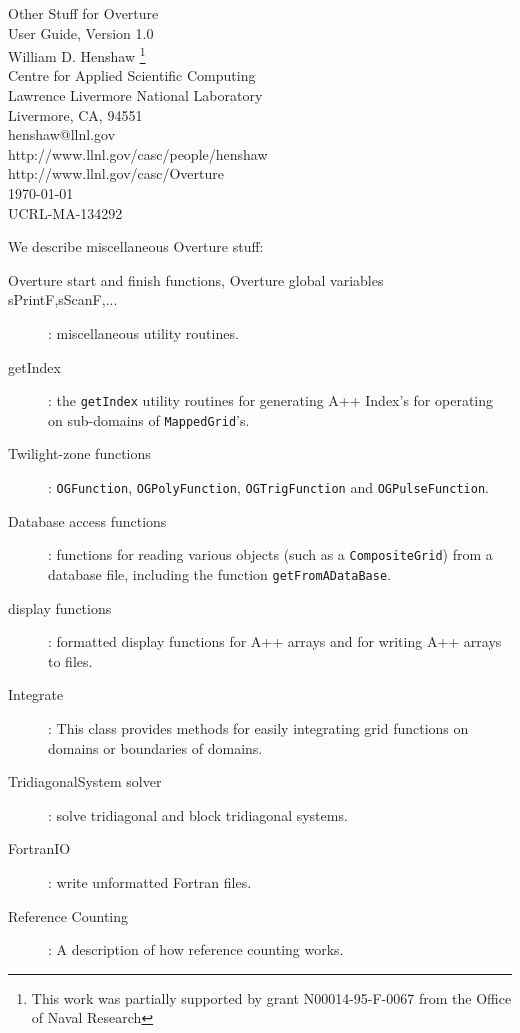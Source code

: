 \documentclass{article}
\begin{document}


\vspace{5\baselineskip}
\begin{flushleft}
{\Large
Other Stuff for Overture\\
User Guide, Version 1.0\\
}
\vspace{2\baselineskip}
William D. Henshaw
\footnote{
        This work was partially
        supported by grant N00014-95-F-0067 from the Office of Naval
        Research
        } \\
\vspace{\baselineskip}
Centre for Applied Scientific Computing \\
Lawrence Livermore National Laboratory    \\
Livermore, CA, 94551   \\
henshaw@llnl.gov \\
http://www.llnl.gov/casc/people/henshaw \\
http://www.llnl.gov/casc/Overture\\
\vspace{\baselineskip}
\today\\
\vspace{\baselineskip}
UCRL-MA-134292

\vspace{4\baselineskip}

We describe miscellaneous Overture stuff:
\begin{description}
 \item[Overture start and finish functions, Overture global variables]
 \item[sPrintF,sScanF,...] : miscellaneous utility routines.
 \item[getIndex] : the {\tt getIndex} utility routines for generating A++ Index's for operating
     on sub-domains of {\tt MappedGrid}'s.
  \item[Twilight-zone functions]: {\tt OGFunction}, {\tt OGPolyFunction}, {\tt OGTrigFunction} and
      {\tt OGPulseFunction}.
  \item[Database access functions]: functions for reading various objects (such as a {\tt CompositeGrid})
     from a database file, including the function {\tt getFromADataBase}.
  \item[display functions] : formatted display functions for A++ arrays and for writing A++ arrays to files.
  \item[Integrate] : This class provides methods for easily integrating grid functions on domains
      or boundaries of domains.
  \item[TridiagonalSystem solver] : solve tridiagonal and block tridiagonal systems.
  \item[FortranIO] : write unformatted Fortran files.
  \item[Reference Counting]: A description of how reference counting works.
\end{description}
\end{flushleft}
\end{document}

